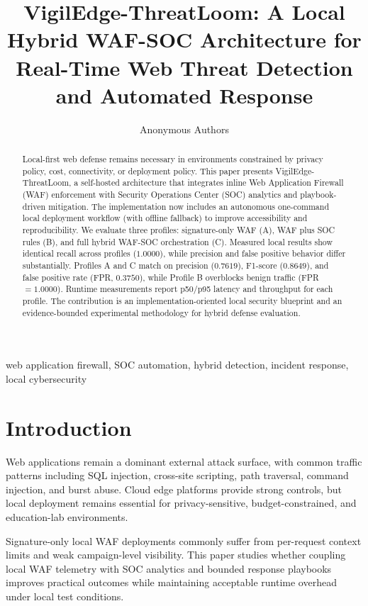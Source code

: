 \documentclass[conference]{IEEEtran}
\title{VigilEdge-ThreatLoom: A Local Hybrid WAF-SOC Architecture for Real-Time Web Threat Detection and Automated Response}
\author{Anonymous Authors}
\begin{document}
\maketitle

\begin{abstract}
Local-first web defense remains necessary in environments constrained by privacy policy, cost, connectivity, or deployment policy. This paper presents VigilEdge-ThreatLoom, a self-hosted architecture that integrates inline Web Application Firewall (WAF) enforcement with Security Operations Center (SOC) analytics and playbook-driven mitigation. The implementation now includes an autonomous one-command local deployment workflow (with offline fallback) to improve accessibility and reproducibility. We evaluate three profiles: signature-only WAF (A), WAF plus SOC rules (B), and full hybrid WAF-SOC orchestration (C). Measured local results show identical recall across profiles ($1.0000$), while precision and false positive behavior differ substantially. Profiles A and C match on precision ($0.7619$), F1-score ($0.8649$), and false positive rate (FPR, $0.3750$), while Profile B overblocks benign traffic (FPR $=1.0000$). Runtime measurements report p50/p95 latency and throughput for each profile. The contribution is an implementation-oriented local security blueprint and an evidence-bounded experimental methodology for hybrid defense evaluation.
\end{abstract}

\begin{IEEEkeywords}
web application firewall, SOC automation, hybrid detection, incident response, local cybersecurity
\end{IEEEkeywords}

\section{Introduction}
Web applications remain a dominant external attack surface, with common traffic patterns including SQL injection, cross-site scripting, path traversal, command injection, and burst abuse. Cloud edge platforms provide strong controls, but local deployment remains essential for privacy-sensitive, budget-constrained, and education-lab environments.

Signature-only local WAF deployments commonly suffer from per-request context limits and weak campaign-level visibility. This paper studies whether coupling local WAF telemetry with SOC analytics and bounded response playbooks improves practical outcomes while maintaining acceptable runtime overhead under local test conditions.
\end{document}
